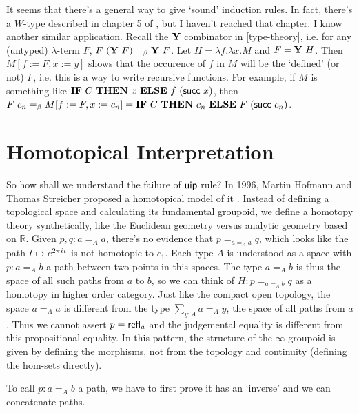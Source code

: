 It seems that there's a general way to give `sound' induction rules.
In fact, there's a $W$-type described in chapter 5 of \cite{homotopy-type-theory},
but I haven't reached that chapter. I know another similar application.
Recall the $\mathbf{Y}$ combinator in \autoref{type-theory}, i.e. for any 
(untyped) $\lambda$-term $F$, $F\ (\mathbf{Y}\ F)=_\beta \mathbf{Y}\ F$.
Let $H=\lambda f.\lambda x.M$ and $F = \mathbf{Y}\ H$. Then
$M[f:=F,x:=y]$ shows that the occurence of $f$ in $M$ will be the `defined'
(or not) $F$, i.e. this is a way to write recursive functions.
For example, if $M$ is something like $\mathbf{IF}\ C\ \mathbf{THEN}\ x
\ \mathbf{ELSE}\ f\ (\succn\ x)$, then $F\ c_n=_\beta M[f:=F,x:=c_n]=
\mathbf{IF}\ C\ \mathbf{THEN}\ c_n\ \mathbf{ELSE}\ F\ (\succn\ c_n)$.

\section{Homotopical Interpretation}
So how shall we understand the failure of $\text{\sf uip}$ rule? In 1996,
Martin Hofmann and Thomas Streicher proposed a homotopical model of
it \cite{the-groupoid-Interpretation-of-type-theory}. Instead of
defining a topological space and calculating its fundamental groupoid,
we define a homotopy theory synthetically, like the Euclidean geometry
versus analytic geometry based on $\mathbb{R}$. Given $p,q:a=_A a$,
there's no evidence that $p=_{a=_Aa}q$, which looks like the path
$t\mapsto e^{2\pi{i\mkern1mu} t}$ is not homotopic to $c_1$. Each type $A$
is understood as a space with $p:a=_A b$ a path between two points in
this spaces. The type $a=_A b$ is thus the space of all such paths
from $a$ to $b$, so we can think of $H:p=_{a=_Ab}q$ as a homotopy in
higher order category. Just like the compact open topology, the space
$a=_Aa$ is different from the type $\sum_{y:A}a =_A y$, the space of
all paths from $a$. Thus we cannot assert $p=\text{\sf refl}_a$ and the judgemental
equality is different from this propositional equality. In this pattern,
the structure of the $\infty$-groupoid is given by defining the morphisms,
not from the topology and continuity (defining the hom-sets directly).

To call $p:a=_Ab$ a path, we have to first prove it has an `inverse' and
we can concatenate paths.

